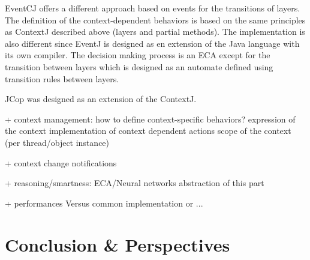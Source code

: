 \documentclass[a4paper]{article}
\begin{document}
EventCJ \cite{kamina_eventcj:_2011} offers a different approach based on events for the transitions of layers. The definition of the context-dependent behaviors is based on the same principles as ContextJ described above (layers and partial methods). The implementation is also different since EventJ is designed as en extension of the Java language with its own compiler. The decision making process is an ECA except for the transition between layers which is designed as an automate defined using transition rules between layers.


JCop \cite{appeltauer_declarative_2013} was designed as an extension of the ContextJ.


+ context management: how to define context-specific behaviors?
  expression of the context
  implementation of context dependent actions
  scope of the context (per thread/object instance)

+ context change notifications

+ reasoning/smartness: ECA/Neural networks
abstraction of this part


+ performances
  Versus common implementation or ...
  

\section{Conclusion \& Perspectives}

%
%



\end{document}
